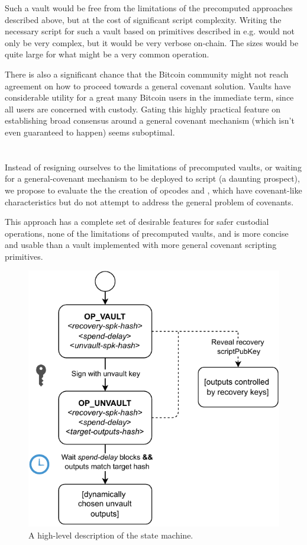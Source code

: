 \documentclass[10pt]{article}
\begin{document}
Such a vault would be free from the limitations of the precomputed approaches described
above, but at the cost of significant script complexity. Writing the necessary script
for such a vault based on primitives described in e.g. \cite{ElementsScript} would not
only be very complex, but it would be very verbose on-chain. The \spk{} sizes would be
quite large for what might be a very common operation.

There is also a significant chance that the Bitcoin community might not reach agreement
on how to proceed towards a general covenant solution. Vaults have considerable utility
for a great many Bitcoin users in the immediate term, since all users are concerned
with custody. Gating this highly practical feature on establishing broad consensus
around a general covenant mechanism (which isn't even guaranteed to happen) seems
suboptimal.

\section*{\opv{}}

Instead of resigning ourselves to the limitations of precomputed vaults, or waiting for
a general-covenant mechanism to be deployed to script (a daunting prospect), we propose
to evaluate the the creation of opcodes \opv{} and \opuv{}, which have covenant-like
characteristics but do not attempt to address the general problem of covenants.

This approach has a complete set of desirable features for safer custodial operations,
none of the limitations of precomputed vaults, and is more concise and usable than a
vault implemented with more general covenant scripting primitives.

\begin{figure}[H]
  \includegraphics[width=0.5\linewidth]{op-vault.pdf}
  \centering
  \caption{A high-level description of the \opv{} state machine.}
\end{figure}
\end{document}
